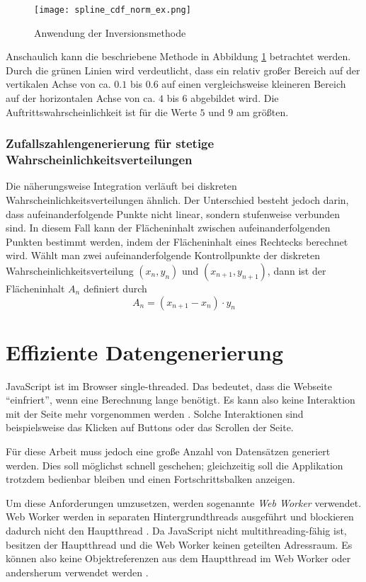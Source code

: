 \begin{figure}[H]
    \centering
    \texttt{[image: spline\_cdf\_norm\_ex.png]}
    \caption{Anwendung der Inversionsmethode}\label{fig:cdfnormex}
\end{figure}

Anschaulich kann die beschriebene Methode in Abbildung \ref{fig:cdfnormex} betrachtet werden. Durch die grünen Linien wird verdeutlicht, dass ein relativ großer Bereich auf der vertikalen Achse von ca. $0.1$ bis $0.6$ auf einen vergleichsweise kleineren Bereich auf der horizontalen Achse von ca. $4$ bis $6$ abgebildet wird. Die Auftrittswahrscheinlichkeit ist für die Werte $5$ und $9$ am größten.

\subsubsection{Zufallszahlengenerierung für stetige Wahrscheinlichkeitsverteilungen}

Die näherungsweise Integration verläuft bei diskreten Wahrscheinlichkeitsverteilungen ähnlich. Der Unterschied besteht jedoch darin, dass aufeinanderfolgende Punkte nicht linear, sondern stufenweise verbunden sind. In diesem Fall kann der Flächeninhalt zwischen aufeinanderfolgenden Punkten bestimmt werden, indem der Flächeninhalt eines Rechtecks berechnet wird.
Wählt man zwei aufeinanderfolgende Kontrollpunkte der diskreten Wahrscheinlichkeitsverteilung $(x_n,y_n)$ und $(x_{n+1},y_{n+1})$, dann ist der Flächeninhalt $A_n$ definiert durch
$$A_n=(x_{n+1}-x_n) \cdot y_n$$

\section{Effiziente Datengenerierung}
JavaScript ist im Browser single-threaded. Das bedeutet, dass die Webseite \enquote{einfriert}, wenn eine Berechnung lange benötigt. Es kann also keine Interaktion mit der Seite mehr vorgenommen werden \cite{googledev:webworkers}. Solche Interaktionen sind beispielsweise das Klicken auf Buttons oder das Scrollen der Seite.

Für diese Arbeit muss jedoch eine große Anzahl von Datensätzen generiert werden. Dies soll möglichst schnell geschehen; gleichzeitig soll die Applikation trotzdem bedienbar bleiben und einen Fortschrittsbalken anzeigen.

Um diese Anforderungen umzusetzen, werden sogenannte \textit{Web Worker} verwendet. Web Worker werden in separaten Hintergrundthreads ausgeführt und blockieren dadurch nicht den Hauptthread \cite{mdn:webworkers}. Da JavaScript nicht multithreading-fähig ist, besitzen der Hauptthread und die Web Worker keinen geteilten Adressraum. Es können also keine Objektreferenzen aus dem Hauptthread im Web Worker oder andersherum verwendet werden \cite{mdn:webworkers}.

